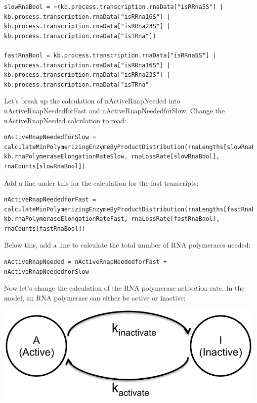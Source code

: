 \documentclass[12pt]{article}
\begin{document}
\lstset{language=Python}
\begin{lstlisting}
slowRnaBool = ~(kb.process.transcription.rnaData["isRRna5S"] | kb.process.transcription.rnaData["isRRna16S"] | kb.process.transcription.rnaData["isRRna23S"] | kb.process.transcription.rnaData["isTRna"])

fastRnaBool = kb.process.transcription.rnaData["isRRna5S"] | kb.process.transcription.rnaData["isRRna16S"] | kb.process.transcription.rnaData["isRRna23S"] | kb.process.transcription.rnaData["isTRna"]
\end{lstlisting}



Let’s break up the calculation of nActiveRnapNeeded into nActiveRnapNeededforFast and nActiveRnapNeededforSlow. Change the nActiveRnapNeeded calculation to read:

\begin{lstlisting}
nActiveRnapNeededforSlow = calculateMinPolymerizingEnzymeByProductDistribution(rnaLengths[slowRnaBool], kb.rnaPolymeraseElongationRateSlow, rnaLossRate[slowRnaBool], rnaCounts[slowRnaBool])
\end{lstlisting}

Add a line under this for the calculation for the fast transcripts:

\begin{lstlisting}
nActiveRnapNeededforFast = calculateMinPolymerizingEnzymeByProductDistribution(rnaLengths[fastRnaBool], kb.rnaPolymeraseElongationRateFast, rnaLossRate[fastRnaBool], rnaCounts[fastRnaBool])
\end{lstlisting}

Below this, add a line to calculate the total number of RNA polymerases needed:

\begin{lstlisting}
nActiveRnapNeeded = nActiveRnapNeededforFast + nActiveRnapNeededforSlow
\end{lstlisting}

Now let’s change the calculation of the RNA polymerase activation rate. In the model, an RNA polymerase can either be active or inactive:

\includegraphics{img.png}
\end{document}
